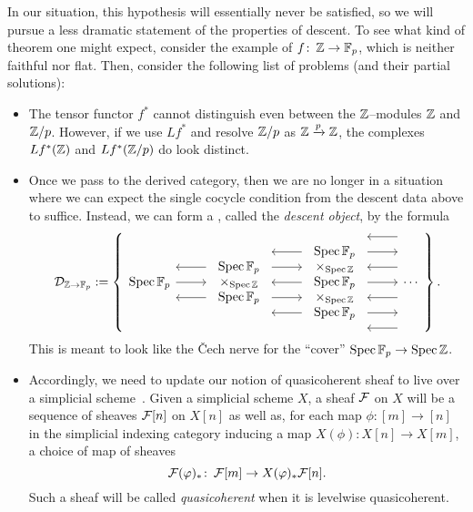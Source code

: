 In our situation, this hypothesis will essentially never be satisfied, so we will pursue a less dramatic statement of the properties of descent.  To see what kind of theorem one might expect, consider the example of $f\colon\thinspace \mathbb Z \to \mathbb F_p$, which is neither faithful nor flat.  Then, consider the following list of problems (and their partial solutions):
\begin{itemize}
\item The tensor functor $f^*$ cannot distinguish even between the $\mathbb Z$--modules $\mathbb Z$ and $\mathbb Z/p$.  However, if we use $Lf^*$ and resolve $\mathbb Z/p$ as $\mathbb Z \xrightarrow{p} \mathbb Z$, the complexes $Lf^*(\mathbb Z)$ and $Lf^*(\mathbb Z/p)$ do look distinct.
\item Once we pass to the derived category, then we are no longer in a situation where we can expect the single cocycle condition from the descent data above to suffice.  Instead, we can form a , called the \textit{descent object}, by the formula
\[\sheaf D_{\Z \to \F_p} := \left\{
\begin{tikzcd}[ampersand replacement=\&]
\Spec \F_p \arrow{r} \arrow[leftarrow,shift left=\baselineskip]{r} \arrow[leftarrow,shift right=\baselineskip]{r} \&
\begin{array}{c} \Spec \F_p \\ \times_{\Spec \Z} \\ \Spec \F_p \end{array} \arrow[leftarrow, shift left=(2*\baselineskip)]{r} \arrow[shift left=\baselineskip]{r} \arrow[leftarrow]{r} \arrow[shift right=\baselineskip]{r} \arrow[leftarrow, shift right=(2*\baselineskip)]{r} \&
\begin{array}{c} \Spec \F_p \\ \times_{\Spec \Z} \\ \Spec \F_p \\ \times_{\Spec \Z} \\ \Spec \F_p \end{array} \arrow[leftarrow, shift left=(3*\baselineskip)]{r} \arrow[shift left=(2*\baselineskip)]{r} \arrow[leftarrow, shift left=\baselineskip]{r} \arrow{r} \arrow[leftarrow, shift right=\baselineskip]{r} \arrow[shift right=(2*\baselineskip)]{r} \arrow[leftarrow, shift right=(3*\baselineskip)]{r} \&
\cdots
\end{tikzcd}
\right\}.\]
This is meant to look like the \v{C}ech nerve for the ``cover'' $\operatorname{Spec} \mathbb F_p \to \operatorname{Spec} \mathbb Z$.
\item Accordingly, we need to update our notion of quasicoherent sheaf to live over a simplicial scheme~\cite[Tag 09VK]{stacks-project}.  Given a simplicial scheme $X$, a sheaf $\mathcal{F}$ on $X$ will be a sequence of sheaves $\mathcal{F}[n]$ on $X[n]$ as well as, for each map $\phi: [m] \to [n]$ in the simplicial indexing category inducing a map $X(\phi): X[n] \to X[m]$, a choice of map of sheaves \[\mathcal{F}(\varphi)_* \colon\thinspace \mathcal{F}[m] \to X(\varphi)_* \mathcal{F}[n].\]  Such a sheaf will be called \textit{quasicoherent} when it is levelwise quasicoherent.

\end{itemize}
